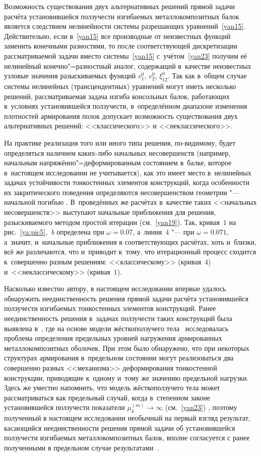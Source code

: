 Возможность существования двух альтернативных решений прямой задачи расчёта установившейся ползучести изгибаемых металлокомпозитных балок является следствием нелинейности системы разрешающих уравнений~\eqref{yan15}. 
Действительно, если в~\eqref{yan15} все производные от неизвестных функций заменить конечными разностями, 
то после соответствующей дискретизации рассматриваемой задачи вместо системы~\eqref{yan15} с~учётом~\eqref{yan23} получим её нелинейный конечно"=разностный аналог, содержащий в~качестве неизвестных узловые значения разыскиваемых функций $v_1^0$, $v_2^0$, $\xi_{12}^0$. 
Так как в~общем случае системы нелинейных (трансцендентных) уравнений могут иметь несколько решений, 
рассматриваемая задача изгиба консольных балок, работающих в~условиях установившейся ползучести, в~определённом диапазоне изменения плотностей армирования полок допускает возможность существования двух альтернативных решений: 
<<классического>> и <<неклассического>>.

На практике реализация того или иного типа решения, по-видимому, будет определяться наличием каких-либо начальных несовершенств (например, начальным напряжённо"=деформированным состоянием в~балке, которое в~настоящем исследовании не учитывается), как это имеет место в~нелинейных задачах устойчивости тонкостенных элементов конструкций, 
когда особенности их закритического поведения определяются несовершенством геометрии "--- начальной погибью \cite{yan:bib17}. 
В~проведённых же расчётах в~качестве таких <<начальных несовершенств>> выступают начальные приближения для решения, разыскиваемого методом простой итерации (см.~\eqref{yan19}). 
Так, кривая~$1$ на рис.~\ref{ya:pic5},~{\sl b} определена при $\omega=0.07$, 
а~линия~$4$ "--- при $\omega=0.071$, а~значит, и~начальные приближения в соответствующих расчётах, хоть и~близки, всё же различаются, что и~приводит к~тому, что итерационный процесс сходится к~совершенно разным решениям: <<классическому>> (кривая~$4$) и~<<неклассическому>> (кривая~$1$).

Насколько известно автору, в настоящем исследовании впервые удалось обнаружить неединственность решения прямой задачи расчёта установившейся ползучести изгибаемых тонкостенных элементов конструкций. 
Ранее неединственность решения в~задачах ползучести таких конструкций была выявлена в~\cite{yan:bib18}, 
где на основе модели жёсткоползучего тела~\cite{yan:bib4} исследовалась проблема определения предельных уровней нагружения армированных металлокомпозитных оболочек. 
При этом было обнаружено, что при некоторых структурах армирования в~предельном состоянии могут реализоваться два совершенно разных <<механизма>> деформирования тонкостенной конструкции, 
приводящие к~одному и~тому же значению предельной нагрузки. 
Здесь же уместно напомнить, что модель жёсткоползучего тела может рассматриваться как предельный случай, 
когда в~степенном законе установившейся ползучести показатели $\mu_k^{(m)}\to\infty$ (см.~\eqref{yan23}) \cite{yan:bib4}, поэтому полученный в настоящем исследовании необычный на первый взгляд результат, касающийся неединственности решения прямой задачи об установившейся ползучести изгибаемых металлокомпозитных балок, вполне согласуется с ранее полученными в предельном случае результатами~\cite{yan:bib18}.

